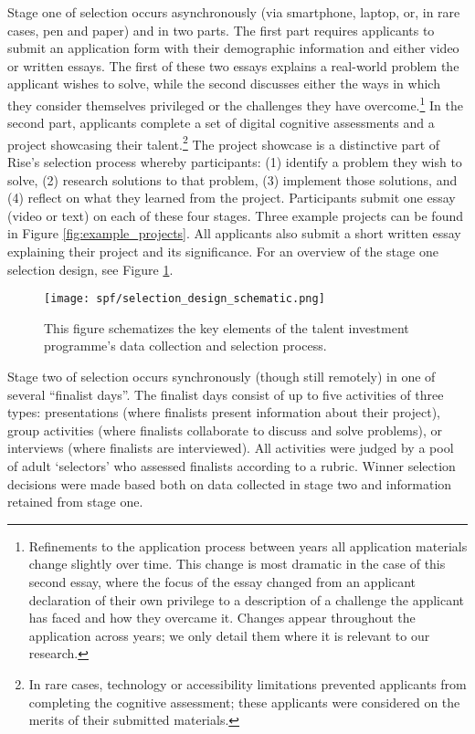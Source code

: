 Stage one of selection occurs asynchronously (via smartphone, laptop, or, in rare cases, pen and paper) and in two parts. The first part requires applicants to submit an application form with their demographic information and either video or written essays. The first of these two essays explains a real-world problem the applicant wishes to solve, while the second discusses either the ways in which they consider themselves privileged or the challenges they have overcome.\footnote{Refinements to the application process between years all application materials change slightly over time. This change is most dramatic in the case of this second essay, where the focus of the essay changed from an applicant declaration of their own privilege to a description of a challenge the applicant has faced and how they overcame it. Changes appear throughout the application across years; we only detail them where it is relevant to our research.} In the second part, applicants complete a set of digital cognitive assessments and a project showcasing their talent.\footnote{In rare cases, technology or accessibility limitations prevented applicants from completing the cognitive assessment; these applicants were considered on the merits of their submitted materials.} The project showcase is a distinctive part of Rise's selection process whereby participants: (1) identify a problem they wish to solve, (2) research solutions to that problem, (3) implement those solutions, and (4) reflect on what they learned from the project. Participants submit one essay (video or text) on each of these four stages. Three example projects can be found in Figure \ref{fig:example_projects}. All applicants also submit a short written essay explaining their project and its significance. For an overview of the stage one selection design, see Figure \ref{fig:design}.

\begin{figure}[!htb]
    \centering
    \caption{This figure schematizes the key elements of the talent investment programme's data collection and selection process. }
    \label{fig:design}
    \texttt{[image: spf/selection\_design\_schematic.png]} 
\end{figure}

Stage two of selection occurs synchronously (though still remotely) in one of several ``finalist days''. The finalist days consist of up to five activities of three types: presentations (where finalists present information about their project), group activities (where finalists collaborate to discuss and solve problems), or interviews (where finalists are interviewed). All activities were judged by a pool of adult `selectors' who assessed finalists according to a rubric. Winner selection decisions were made based both on data collected in stage two and information retained from stage one.

